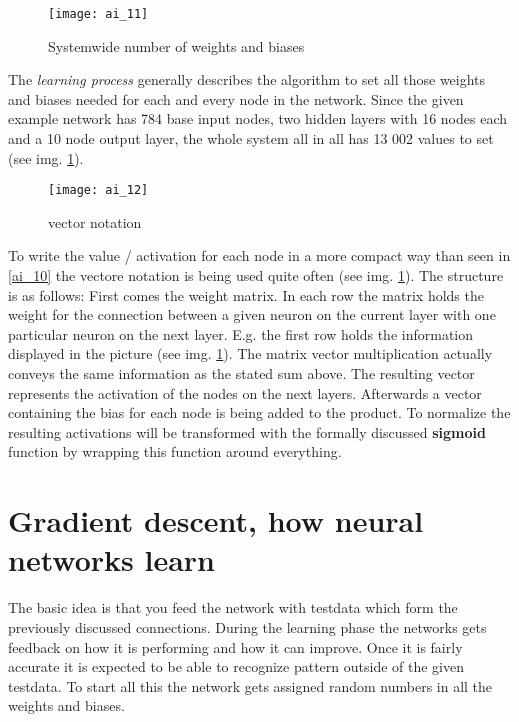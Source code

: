 \documentclass{article}
\begin{document}
\begin{figure}[!htbp]
	\centering
	\texttt{[image: ai\_11]}
	\caption{Systemwide number of weights and biases}
	\label{ai_11}
\end{figure}

The \textit{learning process} generally describes the algorithm to set all those weights and biases needed for each and every node in the network. Since the given example network has 784 base input nodes, two hidden layers with 16 nodes each and a 10 node output layer, the whole system all in all has 13 002 values to set (see img. \ref{ai_11}).

\begin{figure}[!htbp]
	\centering
	\texttt{[image: ai\_12]}
	\caption{vector notation}
	\label{ai_12}
\end{figure}

To write the value / activation for each node in a more compact way than seen in \ref{ai_10} the vectore notation is being used quite often (see img. \ref{ai_11}). The structure is as follows: First comes the weight matrix. In each row the matrix holds the weight for the connection between a given neuron on the current layer with one particular neuron on the next layer. E.g. the first row holds the information displayed in the picture (see img. \ref{ai_11}). The matrix vector multiplication actually conveys the same information as the stated sum above. The resulting vector represents the activation of the nodes on the next layers. Afterwards a vector containing the bias for each node is being added to the product. To normalize the resulting activations will be transformed with the formally discussed \textbf{sigmoid} function by wrapping this function around everything.





\section{Gradient descent, how neural networks learn}

The basic idea is that you feed the network with testdata which form the previously discussed connections. During the learning phase the networks gets feedback on how it is performing and how it can improve. Once it is fairly accurate it is expected to be able to recognize pattern outside of the given testdata. To start all this the network gets assigned random numbers in all the weights and biases.
\end{document}
